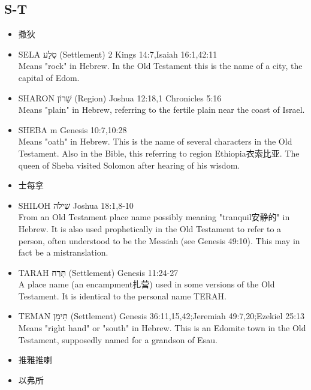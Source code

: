 \subsection{S-T}
\begin{itemize} 
\itemsep-.25em
\item 撒狄  
\item SELA סֶלַע (Settlement) 2 Kings 14:7,Isaiah 16:1,42:11 \\
Means "rock" in Hebrew. In the Old Testament this is the name of a city, the capital of Edom. 
\item SHARON שָׁרוֹן (Region) Joshua 12:18,1 Chronicles 5:16\\
Means "plain" in Hebrew, referring to the fertile plain near the coast of Israel.
\item SHEBA m Genesis 10:7,10:28\\
  Means "oath" in Hebrew. This is the name of several characters in the Old Testament. Also in the Bible, this referring to region Ethiopia衣索比亚. The queen of Sheba visited Solomon after hearing of his wisdom.
\item 士每拿  
\item SHILOH שִׁילֹה  Joshua 18:1,8-10\\
From an Old Testament place name possibly meaning "tranquil安静的" in Hebrew. It is also used prophetically in the Old Testament to refer to a person, often understood to be the Messiah (see Genesis 49:10). This may in fact be a mistranslation. 
\item TARAH תָּרַח (Settlement) Genesis 11:24-27\\
A place name (an encampment扎营) used in some versions of the Old Testament. It is identical to the personal name TERAH.
\item TEMAN תֵּימָן (Settlement) Genesis 36:11,15,42;Jeremiah 49:7,20;Ezekiel 25:13\\
  Means "right hand" or "south" in Hebrew. This is an Edomite town in the Old Testament, supposedly named for a grandson of Esau.
\item 推雅推喇
\item 以弗所
\end{itemize}
